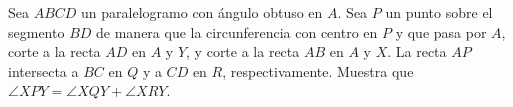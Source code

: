 Sea $ABCD$ un paralelogramo con ángulo obtuso en $A$. Sea $P$ un punto sobre el segmento $BD$ de manera que la circunferencia con centro en $P$ y que pasa por $A$, corte a la recta $AD$ en $A$ y $Y$, y corte a la recta $AB$ en $A$ y $X$. La recta $AP$ intersecta a $BC$ en $Q$ y a $CD$ en $R$, respectivamente. Muestra que $\angle XPY = \angle XQY + \angle XRY$.